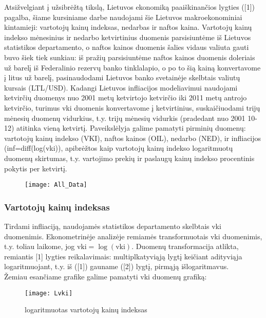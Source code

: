 \documentclass[a4paper]{article}
\begin{document}
Atsižvelgiant į užsibrėžtą tikslą, Lietuvos ekonomiką paaiškinančios lygties ([1]) pagalba, šiame kursiniame darbe naudojami šie Lietuvos makroekonominiai kintamieji: vartotojų kainų indeksas, nedarbas ir naftos kaina. Vartotojų kainų indekso mėnesinius ir nedarbo ketvirtinius duomenis parsisiuntėme iš Lietuvos statistikos departamento, o naftos kainos duomenis šalies vidaus valiuta gauti buvo šiek tiek sunkiau: iš pražių parsisiuntėme naftos kainos duomenis doleriais už barelį iš Federalinio rezervų banko tinklalapio, o po to šią kainą konvertavome į litus už barelį, pasinaudodami Lietuvos banko svetainėje skelbtais valiutų kursais (LTL/USD). Kadangi Lietuvos infliacijos modeliavimui naudojami ketvirčių duomenys nuo 2001 metų ketvirtojo ketvirčio iki 2011 metų antrojo ketvirčio, turimus vki duomenis konvertavome į ketvirtinius, suskaičiuodami trijų mėnesių duomenų vidurkius, t.y. trijų mėnesių vidurkis (pradedant nuo 2001 10-12) atitinka vieną ketvirtį. Paveikslėlyja galime pamatyti pirminių duomenų: vartotojų kainų indekso (VKI), naftos kainos (OIL), nedarbo (NED), ir infliacijos (inf=diff(log(vki)), apibrėžtos kaip vartotojų kainų indekso logaritmuotų duomenų skirtumas, t.y. vartojimo prekių ir paslaugų kainų indekso procentinis pokytis per ketvirtį.

\begin{figure}[hc]
\centering
\texttt{[image: All\_Data]}
\caption{}
\end{figure}

\newpage \subsubsection{Vartotojų kainų indeksas}

Tirdami infliaciją, naudojamės statistikos departamento skelbtais vki duomenimis. Ekonometrinėje analizėje remiamės transformuotais vki duomenimis, t.y. toliau laikome, jog  $\text{vki} = \log(\text{vki})$. Duomenų transformacija atlikta, remiantis [1] lygties reikalavimais: multiplkatyviąją lygtį keičiant adityviąja logaritmuojant, t.y. iš ([1]) gauname ([2]) lygtį, pirmąją išlogaritmavus.\\ Žemiau esančiame grafike galime pamatyti vki duomenų grafiką:

\begin{figure}[!h]
\centering
\texttt{[image: Lvki]}
\caption{logaritmuotas vartotojų kainų indeksas}
\end{figure}
 
\end{document}
